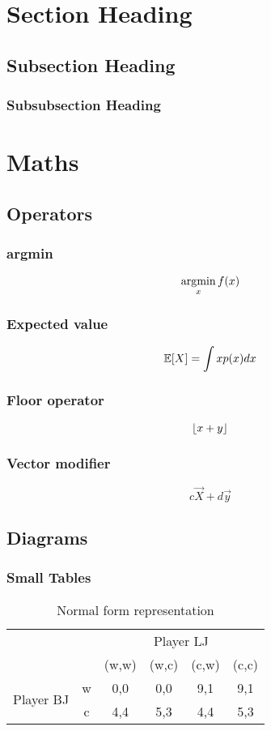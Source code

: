 \documentclass{article}
\begin{document}
\section{Section Heading}
\subsection{Subsection Heading}
\subsubsection{Subsubsection Heading}

\section{Maths}
\subsection{Operators}
\subsubsection{argmin}
$$\operatorname*{\arg\!\min}_{x}{f(x)}$$

\subsubsection{Expected value}
$$\operatorname{\mathbb{E}}[X] = \int{xp(x)dx}$$

\subsubsection{Floor operator}
$$\lfloor x+y\rfloor$$

\subsubsection{Vector modifier}
$$c\vec{X} + d\vec{y}$$

\subsection{Diagrams}
\subsubsection{Small Tables}
\begin{table}[H]
  \centering
    \hspace*{-4em}\begin{tabular}{*{6}{c|}}
      \multicolumn{2}{c}{} & \multicolumn{4}{c}{Player LJ} \\
      \cline{3-6}
      \multicolumn{1}{c}{} & & {(w,w)} & {(w,c)} & {(c,w)} & {(c,c)} \\
      \cline{2-6}
      \multirow{2}{*}{Player BJ} & w & 0,0 & 0,0 & \color{red}9,1 & \color{red}9,1 \\
      \cline{2-6}
      & c & \color{red}4,4 & 5,3 & 4,4 & 5,3 \\
      \cline{2-6}
    \end{tabular}
    \caption{Normal form representation}
\end{table}
\end{document}
